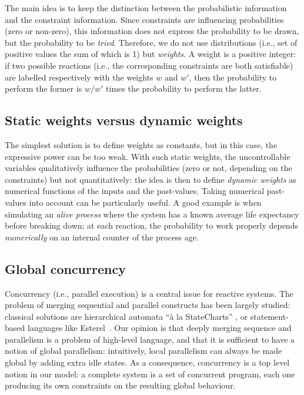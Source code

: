 The main  idea is to  keep the distinction between  the probabilistic
information  and the constraint  information.  Since  constraints are
influencing probabilities  (zero or non-zero),  this information does
not express  the probability to be  drawn, but the  probability to be
{\em tried}.   Therefore, we do  not use distributions (i.e.,  set of
positive values the  sum of which is 1) but  {\em weights}.  A weight
is  a  positive  integer:   if  two  possible  reactions  (i.e.,  the
corresponding   constraints  are   both  satisfiable)   are  labelled
respectively with the  weights $w$ and $w'$, then  the probability to
perform the  former is  $w/w'$ times the  probability to  perform the
latter.



\subsection{Static weights versus dynamic weights}
The simplest solution is to  define weights as constants, but in this
case, the expressive power can be too weak. With such static weights,
the    uncontrollable   variables    qualitatively    influence   the
probabilities  (zero or not,  depending on  the constraints)  but not
quantitatively: the idea  is then to define {\em  dynamic weights} as
numerical  functions  of  the  inputs and  the  past-values.   Taking
numerical past-values into account can be particularly useful. A good
example is  when simulating an  {\em alive process} where  the system
has a  known average  life expectancy before  breaking down;  at each
reaction, the probability to  work properly depends {\em numerically}
on an internal counter of the process age.



\subsection{Global concurrency}
Concurrency  (i.e.,  parallel  execution)  is  a  central  issue  for
reactive  systems. The  problem  of merging  sequential and  parallel
constructs  has   been  largely  studied:   classical  solutions  are
hierarchical       automata        ``\`a       la       StateCharts''
\cite{syncchart96,maraninchi92},  or  statement-based languages  like
Esterel~\cite{esterel}.   Our  opinion  is  that  deeply  merging
sequence  and parallelism is  a problem  of high-level  language, and
that  it  is sufficient  to  have  a  notion of  global  parallelism:
intuitively, local  parallelism can always  be made global  by adding
extra  idle states.   As a  consequence, concurrency  is a  top level
notion  in  our model:  a  complete system  is  a  set of  concurrent
program,  each one  producing its  own constraints  on  the resulting
global behaviour.


